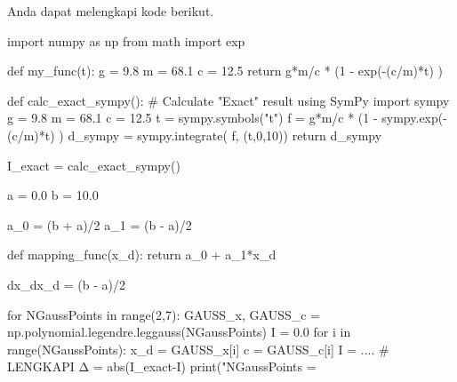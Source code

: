 Anda dapat melengkapi kode berikut.
\begin{pythoncode}
import numpy as np
from math import exp
    
def my_func(t):
    g = 9.8
    m = 68.1
    c = 12.5
    return g*m/c * (1 - exp(-(c/m)*t) )
    
def calc_exact_sympy():
    # Calculate "Exact" result using SymPy
    import sympy
    g = 9.8
    m = 68.1
    c = 12.5
    t = sympy.symbols("t")
    f = g*m/c * (1 - sympy.exp(-(c/m)*t) )
    d_sympy = sympy.integrate( f, (t,0,10))
    return d_sympy
    
I_exact = calc_exact_sympy()
    
a = 0.0
b = 10.0

a_0 = (b + a)/2
a_1 = (b - a)/2

def mapping_func(x_d):
    return a_0 + a_1*x_d

dx_dx_d = (b - a)/2
    
for NGaussPoints in range(2,7):
    GAUSS_x, GAUSS_c = np.polynomial.legendre.leggauss(NGaussPoints)
    I = 0.0
    for i in range(NGaussPoints):
        x_d = GAUSS_x[i]
        c = GAUSS_c[i]
        I = .... # LENGKAPI
    Δ = abs(I_exact-I)
    print("NGaussPoints = %
\end{pythoncode}
